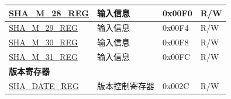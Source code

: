 \begin{longtable}{ | l| p{7.5cm} | p{1.3cm} | p{1cm} | }
\hyperref[regdesc:SHAMNREG]{SHA\_M\_28\_REG} & 输入信息 & 0x00F0 & R/W \\ \hline
\hyperref[regdesc:SHAMNREG]{SHA\_M\_29\_REG} & 输入信息 & 0x00F4 & R/W \\ \hline
\hyperref[regdesc:SHAMNREG]{SHA\_M\_30\_REG} & 输入信息 & 0x00F8 & R/W \\ \hline
\hyperref[regdesc:SHAMNREG]{SHA\_M\_31\_REG} & 输入信息 & 0x00FC & R/W \\ \hline
\multicolumn{4}{|l|}{\textbf{版本寄存器}} \\ \hline
\hyperref[regdesc:SHADATEREG]{SHA\_DATE\_REG} & 版本控制寄存器 & 0x002C & R/W \\ \hline
\end{longtable}
